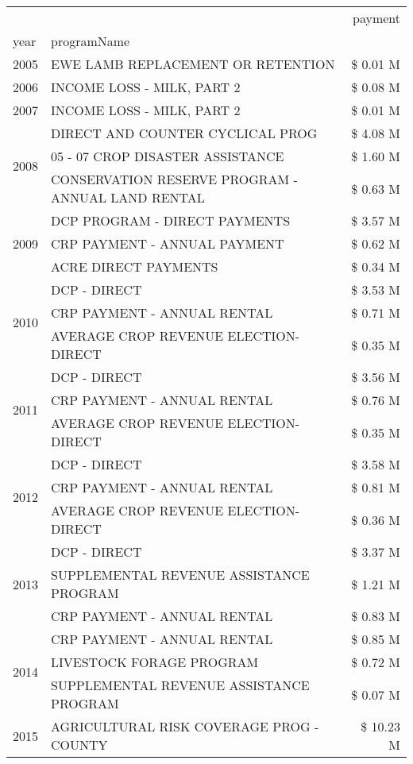 \begin{tabular}{llr}
\toprule
 &  & payment \\
year & programName &  \\
\midrule
2005 & EWE LAMB REPLACEMENT OR RETENTION & \$ 0.01 M \\
\cline{1-3}
2006 & INCOME LOSS - MILK, PART 2 & \$ 0.08 M \\
\cline{1-3}
2007 & INCOME LOSS - MILK, PART 2 & \$ 0.01 M \\
\cline{1-3}
\multirow[t]{3}{*}{2008} & DIRECT AND COUNTER CYCLICAL PROG & \$ 4.08 M \\
 & 05 - 07 CROP DISASTER ASSISTANCE & \$ 1.60 M \\
 & CONSERVATION RESERVE PROGRAM - ANNUAL LAND RENTAL & \$ 0.63 M \\
\cline{1-3}
\multirow[t]{3}{*}{2009} & DCP PROGRAM - DIRECT PAYMENTS & \$ 3.57 M \\
 & CRP PAYMENT - ANNUAL PAYMENT & \$ 0.62 M \\
 & ACRE DIRECT PAYMENTS & \$ 0.34 M \\
\cline{1-3}
\multirow[t]{3}{*}{2010} & DCP - DIRECT & \$ 3.53 M \\
 & CRP PAYMENT - ANNUAL RENTAL & \$ 0.71 M \\
 & AVERAGE CROP REVENUE ELECTION-DIRECT & \$ 0.35 M \\
\cline{1-3}
\multirow[t]{3}{*}{2011} & DCP - DIRECT & \$ 3.56 M \\
 & CRP PAYMENT - ANNUAL RENTAL & \$ 0.76 M \\
 & AVERAGE CROP REVENUE ELECTION-DIRECT & \$ 0.35 M \\
\cline{1-3}
\multirow[t]{3}{*}{2012} & DCP - DIRECT & \$ 3.58 M \\
 & CRP PAYMENT - ANNUAL RENTAL & \$ 0.81 M \\
 & AVERAGE CROP REVENUE ELECTION-DIRECT & \$ 0.36 M \\
\cline{1-3}
\multirow[t]{3}{*}{2013} & DCP - DIRECT & \$ 3.37 M \\
 & SUPPLEMENTAL REVENUE ASSISTANCE PROGRAM & \$ 1.21 M \\
 & CRP PAYMENT - ANNUAL RENTAL & \$ 0.83 M \\
\cline{1-3}
\multirow[t]{3}{*}{2014} & CRP PAYMENT - ANNUAL RENTAL & \$ 0.85 M \\
 & LIVESTOCK FORAGE PROGRAM & \$ 0.72 M \\
 & SUPPLEMENTAL REVENUE ASSISTANCE PROGRAM & \$ 0.07 M \\
\cline{1-3}
\multirow[t]{3}{*}{2015} & AGRICULTURAL RISK COVERAGE PROG - COUNTY & \$ 10.23 M \\

\end{tabular}
